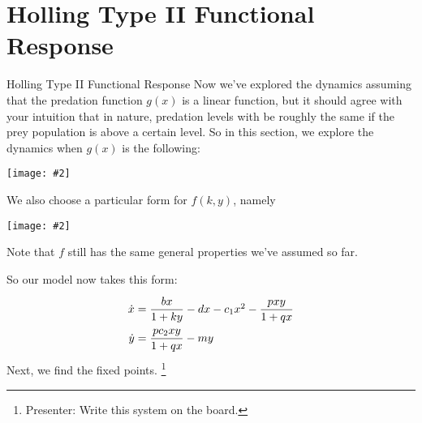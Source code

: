 \documentclass{beamer}
\newcommand{\jpg}[2]{\begin{center}\texttt{[image: \#2]}\end{center}}
\begin{document}
\section{Holling Type II Functional Response}
\begin{frame}{Holling Type II Functional Response}
Now we've explored the dynamics assuming that the predation function $g(x)$ is a linear function, but it should agree with your intuition that in nature, predation levels with be roughly the same if the prey population is above a certain level. So in this section, we explore the dynamics when $g(x)$ is the following:
\jpg{width=.618\textwidth}{holling_type_ii}
\end{frame}
\begin{frame}
We also choose a particular form for $f(k,y)$, namely 
\jpg{width=.618\textwidth}{f_k_y}
Note that $f$ still has the same general properties we've assumed so far. 
\end{frame}
\begin{frame}
So our model now takes this form:
\[\arraycolsep=1.4pt\def\arraystretch{2}
\begin{array}{rcl}
\dot{x}&=&\dfrac{bx}{1+ky}-dx-c_1x^2-\dfrac{pxy}{1+qx}\\
\dot{y}&=&\dfrac{pc_2xy}{1+qx}-my
\end{array}\]
Next, we find the fixed points. \footnote{Presenter: Write this system on the board.} 
\end{frame}
\end{document}

